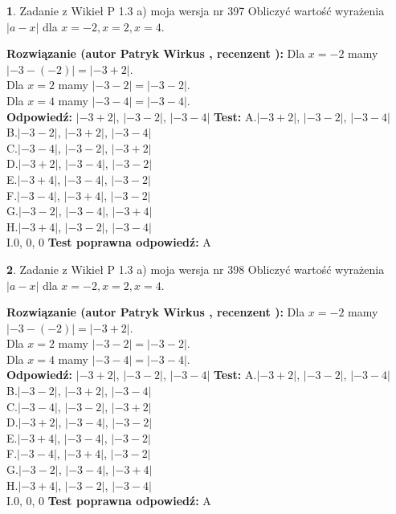 \documentclass[12pt, a4paper]{article}
\theoremstyle{definition} %
\newtheorem{zad}{}
\newcommand{\zadStart}[1]{\begin{zad}#1\newline}
\newcommand{\zadStop}{\end{zad}}
\newcommand{\rozwStart}[2]{\noindent \textbf{Rozwiązanie (autor #1 , recenzent #2): }\newline}
\newcommand{\rozwStop}{\newline}
\newcommand{\odpStart}{\noindent \textbf{Odpowiedź:}\newline}
\newcommand{\odpStop}{\newline}
\newcommand{\testStart}{\noindent \textbf{Test:}\newline}
\newcommand{\testStop}{\newline}
\newcommand{\kluczStart}{\noindent \textbf{Test poprawna odpowiedź:}\newline}
\newcommand{\kluczStop}{\newline}
\begin{document}
\zadStart{Zadanie z Wikieł P 1.3 a) moja wersja nr 397}
Obliczyć wartość wyrażenia $|a - x|$ dla $x=-2,x=2,x=4$.
\zadStop
\rozwStart{Patryk Wirkus}{}
Dla $x = -2$ mamy $|-3 - (-2)| = |-3 + 2|$.\\
Dla $x = 2$ mamy $|-3 - 2| = |-3 - 2|$.\\
Dla $x = 4$ mamy $|-3 - 4| = |-3 - 4|$.\\
\rozwStop
\odpStart
$|-3 + 2|$, $|-3 - 2|$, $|-3 - 4|$
\odpStop
\testStart
A.$|-3 + 2|$, $|-3 - 2|$, $|-3 - 4|$\\
B.$|-3 - 2|$, $|-3 + 2|$, $|-3 - 4|$\\
C.$|-3 - 4|$, $|-3 - 2|$, $|-3 + 2|$\\
D.$|-3 + 2|$, $|-3 - 4|$, $|-3 - 2|$\\
E.$|-3 + 4|$, $|-3 - 4|$, $|-3 - 2|$\\
F.$|-3 - 4|$, $|-3 + 4|$, $|-3 - 2|$\\
G.$|-3 - 2|$, $|-3 - 4|$, $|-3 + 4|$\\
H.$|-3 + 4|$, $|-3 - 2|$, $|-3 - 4|$\\
I.$0$, $0$, $0$
\testStop
\kluczStart
A
\kluczStop



\zadStart{Zadanie z Wikieł P 1.3 a) moja wersja nr 398}
Obliczyć wartość wyrażenia $|a - x|$ dla $x=-2,x=2,x=4$.
\zadStop
\rozwStart{Patryk Wirkus}{}
Dla $x = -2$ mamy $|-3 - (-2)| = |-3 + 2|$.\\
Dla $x = 2$ mamy $|-3 - 2| = |-3 - 2|$.\\
Dla $x = 4$ mamy $|-3 - 4| = |-3 - 4|$.\\
\rozwStop
\odpStart
$|-3 + 2|$, $|-3 - 2|$, $|-3 - 4|$
\odpStop
\testStart
A.$|-3 + 2|$, $|-3 - 2|$, $|-3 - 4|$\\
B.$|-3 - 2|$, $|-3 + 2|$, $|-3 - 4|$\\
C.$|-3 - 4|$, $|-3 - 2|$, $|-3 + 2|$\\
D.$|-3 + 2|$, $|-3 - 4|$, $|-3 - 2|$\\
E.$|-3 + 4|$, $|-3 - 4|$, $|-3 - 2|$\\
F.$|-3 - 4|$, $|-3 + 4|$, $|-3 - 2|$\\
G.$|-3 - 2|$, $|-3 - 4|$, $|-3 + 4|$\\
H.$|-3 + 4|$, $|-3 - 2|$, $|-3 - 4|$\\
I.$0$, $0$, $0$
\testStop
\kluczStart
A
\kluczStop
\end{document}

